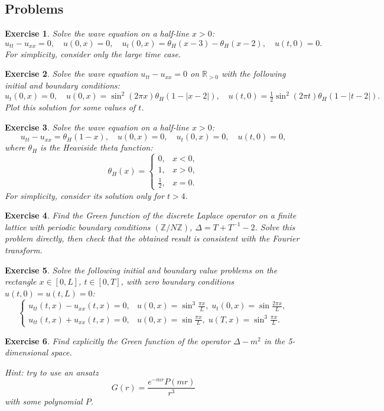 \documentclass[11pt,a4paper]{article}
\newtheorem*{exercise}{Exercise}
\newcommand{\problems}[1]{
	\subsection*{Problems}
	#1
}
\begin{document}
\newpage
\problems{
	\begin{exercise}
		Solve the wave equation on a half-line $x > 0$:
		\[
		u_{tt} - u_{xx} = 0, \quad u(0, x) = 0, \quad u_t(0, x) = \theta_H(x - 3) - \theta_H(x - 2), \quad u(t, 0) = 0.
		\]
		For simplicity, consider only the large time case.
	\end{exercise}
	\begin{exercise}
		Solve the wave equation $u_{tt} - u_{xx} = 0$ on $\mathbb{R}_{>0}$ with the following initial and boundary conditions:
		\[
		u_t(0, x) = 0, \quad u(0, x) = \sin^2(2\pi x)\theta_H(1 - |x - 2|), \quad
		u(t, 0) = \tfrac{1}{2}\sin^2(2\pi t)\theta_H(1 - |t - 2|).
		\]
		Plot this solution for some values of $t$.
	\end{exercise}
	\begin{exercise}
		Solve the wave equation on a half-line $x > 0$:
		\[
		u_{tt} - u_{xx} = \theta_H(1 - x), \quad u(0, x) = 0, \quad u_t(0, x) = 0, \quad u(t, 0) = 0,
		\]
		where $\theta_H$ is the Heaviside theta function:
		\[
		\theta_H(x) =
		\begin{cases}
			0, & x < 0, \\
			1, & x > 0, \\
			\frac{1}{2}, & x = 0.
		\end{cases}
		\]
		For simplicity, consider its solution only for $t > 4$.
	\end{exercise}
\begin{exercise}
	Find the Green function of the discrete Laplace operator on a finite lattice with periodic boundary conditions $(\mathbb{Z}/N\mathbb{Z})$, $\Delta = T + T^{-1} - 2$.  
	Solve this problem directly, then check that the obtained result is consistent with the Fourier transform.
\end{exercise}
\begin{exercise}
	Solve the following initial and boundary value problems on the rectangle $x \in [0, L]$, $t \in [0, T]$, with zero boundary conditions $u(t, 0) = u(t, L) = 0$:
	\[
	\begin{cases}
		u_{tt}(t, x) - u_{xx}(t, x) = 0, & u(0, x) = \sin^3 \frac{\pi x}{L}, \; u_t(0, x) = \sin \frac{2\pi x}{L}, \\
		u_{tt}(t, x) + u_{xx}(t, x) = 0, & u(0, x) = \sin \frac{\pi x}{L}, \; u(T, x) = \sin^3 \frac{\pi x}{L}.
	\end{cases}
	\]
\end{exercise}
\begin{exercise}
	Find explicitly the Green function of the operator $\Delta - m^2$ in the 5-dimensional space.
	
	Hint: try to use an ansatz
	\[
	G(r) = \frac{e^{-mr}P(mr)}{r^3}
	\]
	with some polynomial $P$.
\end{exercise}

}
\end{document}
